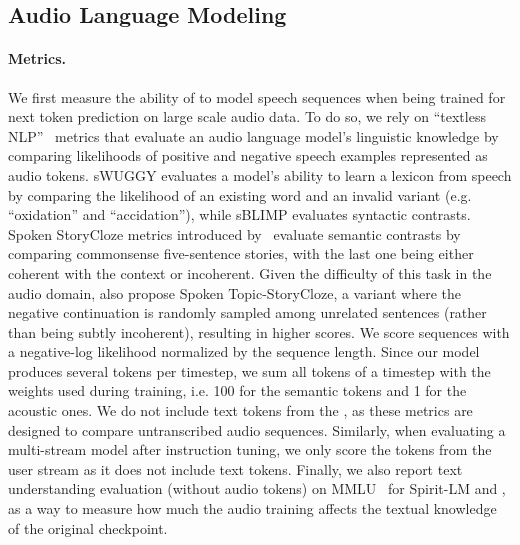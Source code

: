 \subsection{Audio Language Modeling}
\label{sec:eval_audiolm}
\paragraph{Metrics.} We first measure the ability of \ours{} to model speech sequences when being trained for next token prediction on large scale audio data. To do so, we rely on ``textless NLP''~\citep{gslm} metrics that evaluate an audio language model's linguistic knowledge by comparing likelihoods of positive and negative speech examples represented as audio tokens. sWUGGY evaluates a model's ability to learn a lexicon from speech by comparing the likelihood of an existing word and an invalid variant (e.g. ``oxidation'' and ``accidation''), while sBLIMP evaluates syntactic contrasts. Spoken StoryCloze metrics introduced by~\citet{twist} evaluate semantic contrasts by comparing commonsense five-sentence stories, with the last one being either coherent with the context or incoherent. Given the difficulty of this task in the audio domain, \citet{twist} also propose  Spoken Topic-StoryCloze, a variant  where the negative continuation is randomly sampled among unrelated sentences (rather than being subtly incoherent), resulting in higher scores. We score sequences with a negative-log likelihood normalized by the sequence length. Since our model produces several tokens per timestep, we sum all tokens of a timestep with the weights used during training, i.e. 100 for the semantic tokens and 1 for the acoustic ones. We do not include text tokens from the \interleaving{}, as these metrics are designed to compare untranscribed audio sequences. Similarly, when evaluating a multi-stream model after instruction tuning, we only score the tokens from the user stream as it does not include text tokens. Finally, we also report text understanding  evaluation (without audio tokens) on MMLU~\citep{hendrycks2020measuring} for Spirit-LM and \ours{}, as a way to measure how much the audio training affects the textual knowledge of the original checkpoint.
